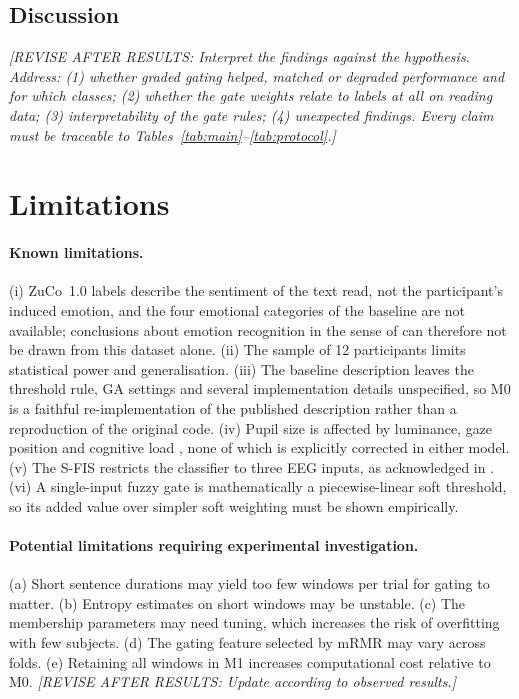 \documentclass[11pt,a4paper]{article}
\newcommand{\revise}[1]{\textcolor{orange!80!black}{\textit{[REVISE AFTER RESULTS: #1]}}}
\newcommand{\dataset}{ZuCo~1.0}
\begin{document}
\subsection{Discussion}
\revise{Interpret the findings against the hypothesis. Address: (1) whether graded gating helped, matched or degraded performance and for which classes; (2) whether the gate weights relate to labels at all on reading data; (3) interpretability of the gate rules; (4) unexpected findings. Every claim must be traceable to Tables~\ref{tab:main}--\ref{tab:protocol}.}

\section{Limitations}
\label{sec:limits}
\paragraph{Known limitations.}
(i) \dataset{} labels describe the sentiment of the text read, not the participant's induced emotion, and the four emotional categories of the baseline are not available; conclusions about emotion recognition in the sense of \cite{FarhadiSedehi2024a} can therefore not be drawn from this dataset alone. (ii) The sample of 12 participants limits statistical power and generalisation. (iii) The baseline description leaves the threshold rule, GA settings and several implementation details unspecified, so M0 is a faithful re-implementation of the published description rather than a reproduction of the original code. (iv) Pupil size is affected by luminance, gaze position and cognitive load \cite{Mathot2018,Raiturkar2016}, none of which is explicitly corrected in either model. (v) The S-FIS restricts the classifier to three EEG inputs, as acknowledged in \cite{FarhadiSedehi2024a}. (vi) A single-input fuzzy gate is mathematically a piecewise-linear soft threshold, so its added value over simpler soft weighting must be shown empirically.

\paragraph{Potential limitations requiring experimental investigation.}
(a) Short sentence durations may yield too few windows per trial for gating to matter. (b) Entropy estimates on short windows may be unstable. (c) The membership parameters may need tuning, which increases the risk of overfitting with few subjects. (d) The gating feature selected by mRMR may vary across folds. (e) Retaining all windows in M1 increases computational cost relative to M0. \revise{Update according to observed results.}
\end{document}
